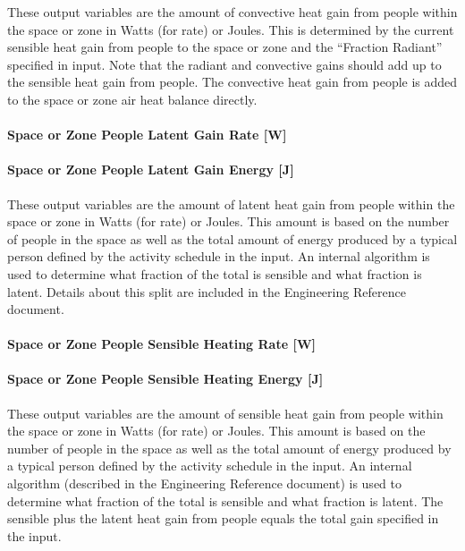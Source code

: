 These output variables are the amount of convective heat gain from people within the space or zone in Watts (for rate) or Joules. This is determined by the current sensible heat gain from people to the space or zone and the ``Fraction Radiant'' specified in input. Note that the radiant and convective gains should add up to the sensible heat gain from people. The convective heat gain from people is added to the space or zone air heat balance directly.

\paragraph{Space or Zone People Latent Gain Rate {[}W{]}}\label{zone-people-latent-gain-rate-w}

\paragraph{Space or Zone People Latent Gain Energy {[}J{]}}\label{zone-people-latent-gain-energy-j}

These output variables are the amount of latent heat gain from people within the space or zone in Watts (for rate) or Joules. This amount is based on the number of people in the space as well as the total amount of energy produced by a typical person defined by the activity schedule in the input. An internal algorithm is used to determine what fraction of the total is sensible and what fraction is latent. Details about this split are included in the Engineering Reference document.

\paragraph{Space or Zone People Sensible Heating Rate {[}W{]}}\label{zone-people-sensible-heating-rate-w}

\paragraph{Space or Zone People Sensible Heating Energy {[}J{]}}\label{zone-people-sensible-heating-energy-j}

These output variables are the amount of sensible heat gain from people within the space or zone in Watts (for rate) or Joules. This amount is based on the number of people in the space as well as the total amount of energy produced by a typical person defined by the activity schedule in the input. An internal algorithm (described in the Engineering Reference document) is used to determine what fraction of the total is sensible and what fraction is latent. The sensible plus the latent heat gain from people equals the total gain specified in the input.

